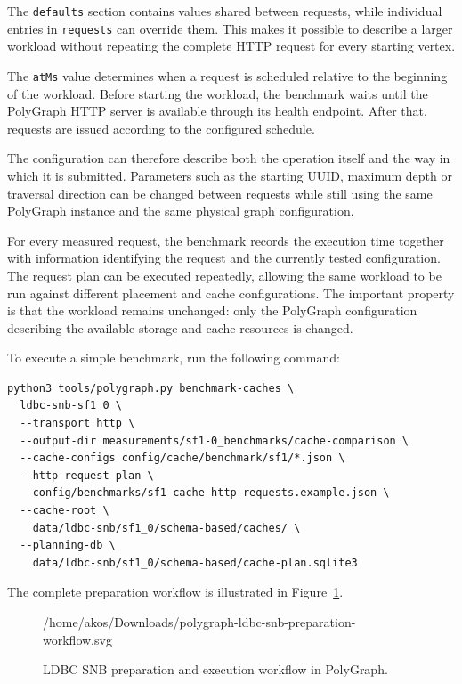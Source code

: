 \documentclass[11pt,a4paper]{article}
\begin{document}
The \texttt{defaults} section contains values shared between requests, while
individual entries in \texttt{requests} can override them. This makes it
possible to describe a larger workload without repeating the complete HTTP
request for every starting vertex.

The \texttt{atMs} value determines when a request is scheduled relative to the
beginning of the workload. Before starting the workload, the benchmark waits
until the PolyGraph HTTP server is available through its health endpoint. After
that, requests are issued according to the configured schedule.

The configuration can therefore describe both the operation itself and the
way in which it is submitted. Parameters such as the starting UUID, maximum
depth or traversal direction can be changed between requests while still using
the same PolyGraph instance and the same physical graph configuration.

For every measured request, the benchmark records the execution time together
with information identifying the request and the currently tested
configuration. The request plan can be executed repeatedly, allowing the same
workload to be run against different placement and cache configurations. The
important property is that the workload remains unchanged: only the PolyGraph
configuration describing the available storage and cache resources is changed.

To execute a simple benchmark, run the following command:
\begin{lstlisting}[style=bash]
python3 tools/polygraph.py benchmark-caches \
  ldbc-snb-sf1_0 \
  --transport http \
  --output-dir measurements/sf1-0_benchmarks/cache-comparison \
  --cache-configs config/cache/benchmark/sf1/*.json \
  --http-request-plan \
    config/benchmarks/sf1-cache-http-requests.example.json \
  --cache-root \
    data/ldbc-snb/sf1_0/schema-based/caches/ \
  --planning-db \
    data/ldbc-snb/sf1_0/schema-based/cache-plan.sqlite3
\end{lstlisting}

The complete preparation workflow is illustrated in
Figure~\ref{fig:ldbc-preparation-workflow}.

\begin{figure}[htbp]
    \centering
    
        {/home/akos/Downloads/polygraph-ldbc-snb-preparation-workflow.svg}
    \caption{LDBC SNB preparation and execution workflow in PolyGraph.}
    \label{fig:ldbc-preparation-workflow}
\end{figure}
\end{document}
